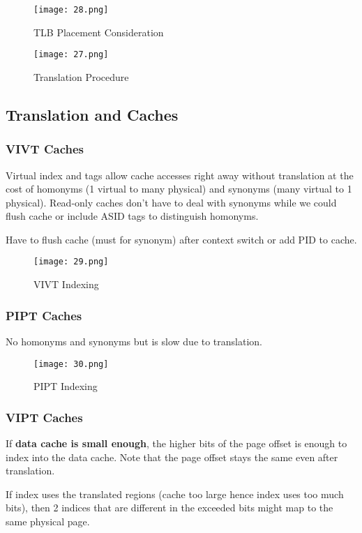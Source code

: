 \documentclass{article}
\begin{document}
\begin{multicols*}{2}
\begin{figure}[H]
    \centering
    {\texttt{[image: 28.png]}}
  \caption{TLB Placement Consideration}
\end{figure}

\begin{figure}[H]
    \centering
    {\texttt{[image: 27.png]}}
  \caption{Translation Procedure}
\end{figure}

\subsection*{Translation and Caches}
\subsubsection*{VIVT Caches}
Virtual index and tags allow cache accesses right away without translation at the cost of homonyms (1 virtual to many physical) and synonyms (many virtual to 1 physical). Read-only caches don't have to deal with synonyms while we could flush cache or include ASID tags to distinguish homonyms.
\medskip\par\noindent
Have to flush cache (must for synonym) after context switch or add PID to cache.

\begin{figure}[H]
    \centering
    {\texttt{[image: 29.png]}}
  \caption{VIVT Indexing}
\end{figure}

\subsubsection*{PIPT Caches}
No homonyms and synonyms but is slow due to translation.

\begin{figure}[H]
    \centering
    {\texttt{[image: 30.png]}}
  \caption{PIPT Indexing}
\end{figure}

\subsubsection*{VIPT Caches}
If \textbf{data cache is small enough}, the higher bits of the page offset is enough to index into the data cache. Note that the page offset stays the same even after translation. 
\medskip\par\noindent
If index uses the translated regions (cache too large hence index uses too much bits), then 2 indices that are different in the exceeded bits might map to the same physical page.


\end{multicols*}
\end{document}
